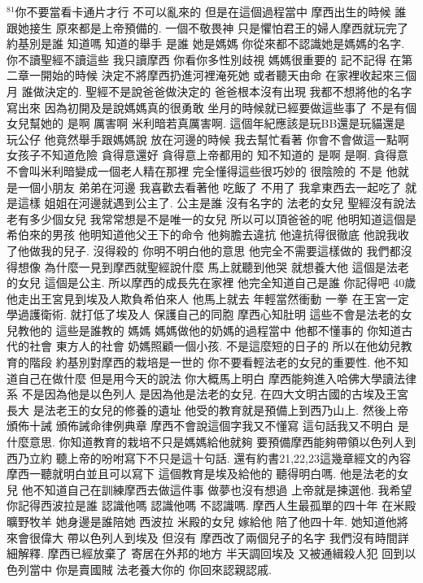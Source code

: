 \documentclass{book}
\begin{document}
$^{81}$你不要當看卡通片才行 不可以亂來的 但是在這個過程當中 摩西出生的時候 誰跟她接生 原來都是上帝預備的.
一個不敬畏神 只是懼怕君王的婦人摩西就玩完了 約基別是誰 知道嗎 知道的舉手 是誰 她是媽媽 你從來都不認識她是媽媽的名字.
你不讀聖經不讀這些 我只讀摩西 你看你多性別歧視 媽媽很重要的 記不記得 在第二章一開始的時候 決定不將摩西扔進河裡淹死她 或者聽天由命 在家裡收起來三個月 誰做決定的.
聖經不是說爸爸做決定的 爸爸根本沒有出現 我都不想將他的名字寫出來 因為初開及是說媽媽真的很勇敢 坐月的時候就已經要做這些事了 不是有個女兒幫她的 是啊 厲害啊 米利暗若真厲害啊.
這個年紀應該是玩BB還是玩貓還是玩公仔 他竟然舉手跟媽媽說 放在河邊的時候 我去幫忙看著 你會不會做這一點啊 女孩子不知道危險 貪得意還好 貪得意上帝都用的 知不知道的 是啊 是啊.
貪得意不會叫米利暗變成一個老人精在那裡 完全懂得這些很巧妙的 很陰險的 不是 他就是一個小朋友 弟弟在河邊 我喜歡去看著他 吃飯了 不用了 我拿東西去一起吃了 就是這樣 姐姐在河邊就遇到公主了.
公主是誰 沒有名字的 法老的女兒 聖經沒有說法老有多少個女兒 我常常想是不是唯一的女兒 所以可以頂爸爸的呢 他明知道這個是希伯來的男孩 他明知道他父王下的命令 他夠膽去違抗 他違抗得很徹底 他說我收了他做我的兒子.
沒得殺的 你明不明白他的意思 他完全不需要這樣做的 我們都沒得想像 為什麼一見到摩西就聖經說什麼 馬上就聽到他哭 就想養大他 這個是法老的女兒 這個是公主.
所以摩西的成長先在家裡 他完全知道自己是誰 你記得吧 40歲他走出王宮見到埃及人欺負希伯來人 他馬上就去 年輕當然衝動 一拳 在王宮一定學過護衛術.
就打低了埃及人 保護自己的同胞 摩西心知肚明 這些不會是法老的女兒教他的 這些是誰教的 媽媽 媽媽做他的奶媽的過程當中 他都不懂事的 你知道古代的社會 東方人的社會 奶媽照顧一個小孩.
不是這麼短的日子的 所以在他幼兒教育的階段 約基別對摩西的栽培是一世的 你不要看輕法老的女兒的重要性.
他不知道自己在做什麼 但是用今天的說法 你大概馬上明白 摩西能夠進入哈佛大學讀法律系 不是因為他是以色列人 是因為他是法老的女兒.
在四大文明古國的古埃及王宮長大 是法老王的女兒的修養的遺址 他受的教育就是預備上到西乃山上.
然後上帝頒佈十誡 頒佈誡命律例典章 摩西不會說這個字我又不懂寫 這句話我又不明白 是什麼意思.
你知道教育的栽培不只是媽媽給他就夠 要預備摩西能夠帶領以色列人到西乃立約 聽上帝的吩咐寫下不只是這十句話.
還有約書21,22,23這幾章經文的內容 摩西一聽就明白並且可以寫下 這個教育是埃及給他的 聽得明白嗎.
他是法老的女兒 他不知道自己在訓練摩西去做這件事 做夢也沒有想過 上帝就是揀選他.
我希望你記得西波拉是誰 認識他嗎 認識他嗎 不認識嗎.
摩西人生最孤單的四十年 在米殿曠野牧羊 她身邊是誰陪她 西波拉 米殿的女兒 嫁給他 陪了他四十年.
她知道他將來會很偉大 帶以色列人到埃及 但沒有 摩西改了兩個兒子的名字 我們沒有時間詳細解釋.
摩西已經放棄了 寄居在外邦的地方 半天調回埃及 又被通緝殺人犯 回到以色列當中 你是賣國賊 法老養大你的 你回來認親認戚.
\end{document}
